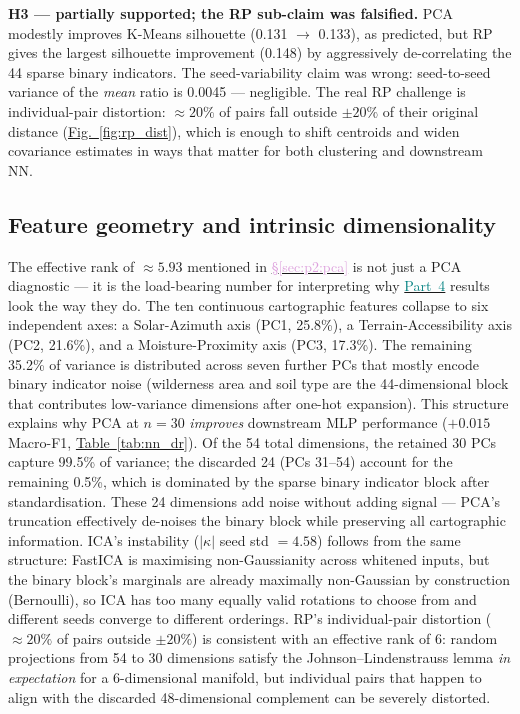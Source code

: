 \documentclass[conference]{IEEEtran}
\newcommand{\figref}[1]{\hyperref[#1]{\textcolor{denim_comp}{Fig.~\ref*{#1}}}}
\newcommand{\tabref}[1]{\hyperref[#1]{\textcolor{sage}{Table~\ref*{#1}}}}
\newcommand{\secref}[1]{\hyperref[#1]{\textcolor{plum}{\S\ref*{#1}}}}
\newcommand{\partref}[2]{\hyperref[#2]{\textcolor{teal}{Part~#1}}}
\begin{document}
\textbf{H3 --- partially supported; the RP sub-claim was falsified.}
PCA modestly improves K-Means silhouette (0.131 $\to$ 0.133), as predicted,
but RP gives the largest silhouette improvement (0.148) by aggressively
de-correlating the 44 sparse binary indicators.
The seed-variability claim was wrong: seed-to-seed variance of the \emph{mean}
ratio is 0.0045 --- negligible.
The real RP challenge is individual-pair distortion: ${\approx}20\%$ of pairs
fall outside $\pm 20\%$ of their original distance (\figref{fig:rp_dist}),
which is enough to shift centroids and widen covariance estimates in ways
that matter for both clustering and downstream NN.

\subsection{Feature geometry and intrinsic dimensionality}\label{sec:disc:efrank}
The effective rank of $\approx 5.93$ mentioned in \secref{sec:p2:pca} is
not just a PCA diagnostic --- it is the load-bearing number for interpreting
why \partref{4}{sec:p4} results look the way they do.
The ten continuous cartographic features collapse to six independent axes:
a Solar-Azimuth axis (PC1, 25.8\%), a Terrain-Accessibility axis (PC2,
21.6\%), and a Moisture-Proximity axis (PC3, 17.3\%).
The remaining 35.2\% of variance is distributed across seven further PCs
that mostly encode binary indicator noise (wilderness area and soil type
are the 44-dimensional block that contributes low-variance dimensions
after one-hot expansion).
This structure explains why PCA at $n{=}30$ \emph{improves} downstream MLP
performance ($+0.015$ Macro-F1, \tabref{tab:nn_dr}).
Of the 54 total dimensions, the retained 30 PCs capture 99.5\% of variance;
the discarded 24 (PCs 31--54) account for the remaining 0.5\%, which is
dominated by the sparse binary indicator block after standardisation.
These 24 dimensions add noise without adding signal --- PCA's truncation
effectively de-noises the binary block while preserving all cartographic
information.
ICA's instability ($|\kappa|$ seed std $= 4.58$) follows from the same
structure: FastICA is maximising non-Gaussianity across whitened inputs, but
the binary block's marginals are already maximally non-Gaussian by
construction (Bernoulli), so ICA has too many equally valid rotations to
choose from and different seeds converge to different orderings.
RP's individual-pair distortion (${\approx}20\%$ of pairs outside $\pm 20\%$)
is consistent with an effective rank of 6: random projections from 54 to 30
dimensions satisfy the Johnson--Lindenstrauss lemma
\emph{in expectation} for a 6-dimensional manifold, but individual pairs
that happen to align with the discarded 48-dimensional complement can
be severely distorted.
\end{document}
